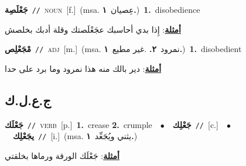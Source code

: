\documentclass[10pt,a4paper,twoside]{article} %
\begin{document}
\begin{multicols}{2}
{\setlength\topsep{0pt}\textbf{\foreignlanguage{arabic}{جَعْلَصِة}}\ {\color{gray}\texttt{//}\color{black}}\ \textsc{noun}\ [f.]\ \color{gray}(msa. \foreignlanguage{arabic}{عِصيان}~\foreignlanguage{arabic}{\textbf{١.}})\color{black}\ \textbf{1.}~disobedience\  \begin{flushright}\color{gray}\foreignlanguage{arabic}{\textbf{\underline{\foreignlanguage{arabic}{أمثلة}}}: إِذا بدي أحاسبك عجَعْلَصتك وقلة أدبك بخلصش}\end{flushright}\color{black}} \vspace{2mm}

{\setlength\topsep{0pt}\textbf{\foreignlanguage{arabic}{مْجَعْلِص}}\ {\color{gray}\texttt{//}\color{black}}\ \textsc{adj}\ [m.]\ \color{gray}(msa. \foreignlanguage{arabic}{نمرود}~\foreignlanguage{arabic}{\textbf{٢.}}  .\foreignlanguage{arabic}{غير مطيع}~\foreignlanguage{arabic}{\textbf{١.}})\color{black}\ \textbf{1.}~disobedient\  \begin{flushright}\color{gray}\foreignlanguage{arabic}{\textbf{\underline{\foreignlanguage{arabic}{أمثلة}}}: دير بالك منه هذا نمرود وما برد على حدا}\end{flushright}\color{black}} \vspace{2mm}

\vspace{-3mm}
\subsection*{\color{blue}\foreignlanguage{arabic}{ج.ع.ل.ك}\color{blue}{}} 

{\setlength\topsep{0pt}\textbf{\foreignlanguage{arabic}{جَعْلَك}}\ {\color{gray}\texttt{//}\color{black}}\ \textsc{verb}\ [p.]\ \textbf{1.}~crease  \textbf{2.}~crumple\ \ $\bullet$\ \ \setlength\topsep{0pt}\textbf{\foreignlanguage{arabic}{جَعْلِك}}\ {\color{gray}\texttt{//}\color{black}}\ [c.]\ \ $\bullet$\ \ \setlength\topsep{0pt}\textbf{\foreignlanguage{arabic}{يجَعْلِك}}\ {\color{gray}\texttt{//}\color{black}}\ [i.]\ \color{gray}(msa. \foreignlanguage{arabic}{يثني ويُجَعِّد}~\foreignlanguage{arabic}{\textbf{١.}})\color{black}\  \begin{flushright}\color{gray}\foreignlanguage{arabic}{\textbf{\underline{\foreignlanguage{arabic}{أمثلة}}}: جَعْلَك الورقة ورماها بخلقتي}\end{flushright}\color{black}} \vspace{2mm}


\end{multicols}
\end{document}
